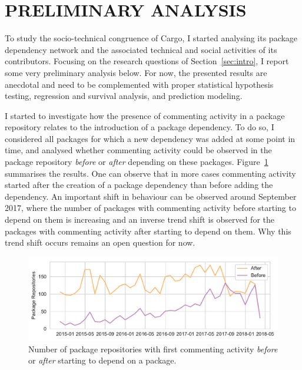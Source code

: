 \section{PRELIMINARY ANALYSIS}

To study the socio-technical congruence of Cargo, I started analysing its package dependency network and the associated technical and social activities of its contributors.
Focusing on the research questions of Section~\ref{sec:intro}, I report some very preliminary analysis below.
For now, the presented results are anecdotal and need to be complemented with proper statistical hypothesis testing, regression and survival analysis, and prediction modeling.

I started to investigate how the presence of commenting activity in a package repository relates to the introduction of a package dependency.
To do so, I considered all packages for which a new dependency was added at some point in time, and analysed whether commenting activity could be observed in the package repository \emph{before} or \emph{after} depending on these packages. Figure~\ref{fig:fig1} summarises the results. One can observe that in more cases commenting activity started after the creation of a package dependency than before adding the dependency. 
An important shift in behaviour can be observed around September 2017, where the number of packages with commenting activity before starting to depend on them is increasing and an inverse trend shift is observed for the packages with commenting activity  after starting to depend on them. Why this trend shift occurs remains an open question for now.

\begin{figure}[thb]
    \includegraphics[width=\columnwidth]{Photos/RQ21.pdf} 
    \caption{Number of package repositories with first commenting activity \emph{before} or \emph{after} starting to depend on a package.}
    \label{fig:fig1}
\end{figure}

